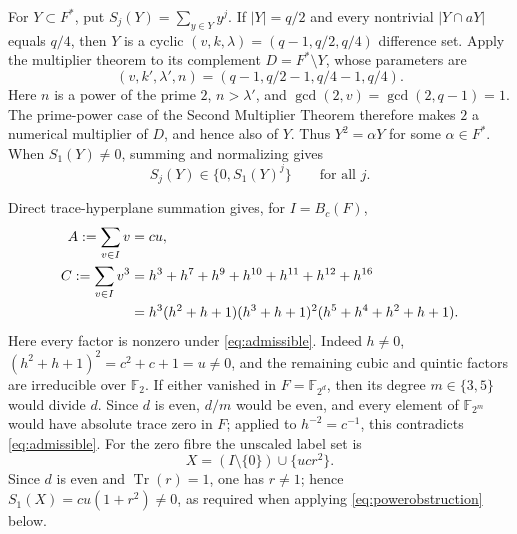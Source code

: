 \documentclass[11pt]{article}
\theoremstyle{definition}\newtheorem{definition}[theorem]{Definition}
\theoremstyle{remark}\newtheorem{remark}[theorem]{Remark}
\DeclareMathOperator{\Tr}{Tr}
\newcommand{\F}{\mathbb F}
\begin{document}
For \(Y\subset F^*\), put \(S_j(Y)=\sum_{y\in Y}y^j\).  If
\(|Y|=q/2\) and every nontrivial \(|Y\cap aY|\) equals \(q/4\), then \(Y\)
is a cyclic \((v,k,\lambda)=(q-1,q/2,q/4)\) difference set.  Apply the
multiplier theorem to its complement \(D=F^*\setminus Y\), whose parameters
are
\[
 (v,k',\lambda',n)=(q-1,q/2-1,q/4-1,q/4).
\]
Here \(n\) is a power of the prime \(2\), \(n>\lambda'\), and
\(\gcd(2,v)=\gcd(2,q-1)=1\).  The prime-power case of the Second Multiplier
Theorem \cite[Section~4]{xiang} therefore makes \(2\) a numerical multiplier
of \(D\), and hence also of \(Y\).  Thus \(Y^2=\alpha Y\) for some
\(\alpha\in F^*\).
When \(S_1(Y)\neq0\), summing and normalizing gives
\begin{equation}
 S_j(Y)\in\{0,S_1(Y)^j\}\qquad\text{for all }j.
 \label{eq:powerobstruction}
\end{equation}

Direct trace-hyperplane summation gives, for \(I=B_c(F)\),
\begin{align}
 A:=\sum_{v\in I}v&=cu,\label{eq:S1}\\
 C:=\sum_{v\in I}v^3
 &=h^3+h^7+h^9+h^{10}+h^{11}+h^{12}+h^{16}\notag\\
 &=h^3(h^2+h+1)(h^3+h+1)^2(h^5+h^4+h^2+h+1).
 \label{eq:S3}
\end{align}
Here every factor is nonzero under \eqref{eq:admissible}.  Indeed \(h\ne0\),
\((h^2+h+1)^2=c^2+c+1=u\ne0\), and the remaining cubic and quintic factors
are irreducible over \(\F_2\).  If either vanished in \(F=\F_{2^d}\), then its
degree \(m\in\{3,5\}\) would divide \(d\).  Since \(d\) is even, \(d/m\) would
be even, and every element of \(\F_{2^m}\) would have absolute trace zero in
\(F\); applied to \(h^{-2}=c^{-1}\), this contradicts
\eqref{eq:admissible}.  For the zero fibre the unscaled label set is
\[
 X=(I\setminus\{0\})\cup\{ucr^2\}.
\]
Since \(d\) is even and \(\Tr(r)=1\), one has \(r\ne1\); hence
\(S_1(X)=cu(1+r^2)\ne0\), as required when applying
\eqref{eq:powerobstruction} below.
\end{document}
